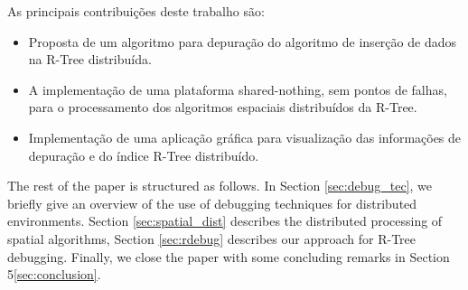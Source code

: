 As principais contribuições deste trabalho são:

\begin{itemize}
  \item Proposta de um algoritmo para depuração do algoritmo de inserção de dados na R-Tree distribuída.
	\item A implementação de uma plataforma shared-nothing, sem pontos de falhas, para o processamento dos algoritmos espaciais distribuídos da R-Tree.
	\item Implementação de uma aplicação gráfica para visualização das informações de depuração e do índice R-Tree distribuído.
\end{itemize}

The rest of the paper is structured as follows. In Section \ref{sec:debug_tec}, we briefly give an overview of the use of debugging techniques for distributed environments. Section \ref{sec:spatial_dist} describes the distributed processing of spatial algorithms, Section \ref{sec:rdebug} describes our approach for R-Tree debugging. Finally, we close the paper with some concluding remarks in Section 5\ref{sec:conclusion}.